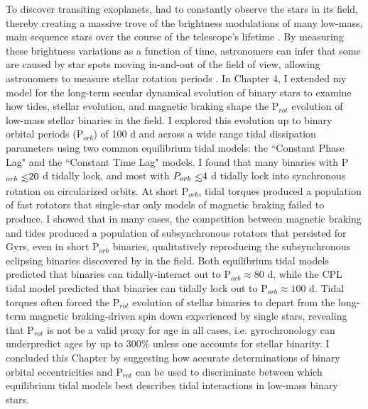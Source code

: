 To discover transiting exoplanets, \kepler had to constantly observe the stars in its field, thereby creating a massive trove of the brightness modulations of many low-mass, main sequence stars over the course of the telescope's lifetime \citep{Borucki2003,Borucki2010}. By measuring these brightness variations as a function of time, astronomers can infer that some are caused by star spots moving in-and-out of the field of view, allowing astronomers to measure stellar rotation periods \citep[P$_{rot}$, see][]{McQuillan2014}. In Chapter 4, I extended my model for the long-term secular dynamical evolution of binary stars to examine how tides, stellar evolution, and magnetic braking shape the P$_{rot}$ evolution of low-mass stellar binaries in the \kepler field. I explored this evolution up to binary orbital periods (P$_{orb}$) of 100 d and across a wide range tidal dissipation parameters using two common equilibrium tidal models: the ``Constant Phase Lag" \citep[CPL][]{FerrazMello2008} and the ``Constant Time Lag" \citep[CTL][]{Leconte2010} models. I found that many binaries with P$_{orb} \lsim 20$ d tidally lock, and most with $P_{orb} \lsim 4$ d tidally lock into synchronous rotation on circularized orbits. At short P$_{orb}$, tidal torques produced a population of fast rotators that single-star only models of magnetic braking failed to produce.  I showed that in many cases, the competition between magnetic braking and tides produced a population of subsynchronous rotators that persisted for Gyrs, even in short P$_{orb}$ binaries, qualitatively reproducing the subsynchronous eclipsing binaries discovered by \citet{Lurie2017} in the \kepler field. Both equilibrium tidal models predicted that binaries can tidally-interact out to P$_{orb} \approx 80$ d, while the CPL tidal model predicted that binaries can tidally lock out to P$_{orb} \approx 100$ d. Tidal torques often forced the P$_{rot}$ evolution of stellar binaries to depart from the long-term magnetic braking-driven spin down experienced by single stars, revealing that P$_{rot}$ is not be a valid proxy for age in all cases, i.e. gyrochronology can underpredict ages by up to $300\%$ unless one accounts for stellar binarity. I concluded this Chapter by suggesting how accurate determinations of binary orbital eccentricities and P$_{rot}$ can be used to discriminate between which equilibrium tidal models best describes tidal interactions in low-mass binary stars.
 
